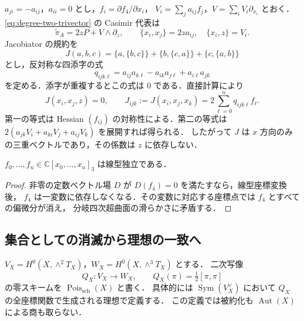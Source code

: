 $a_{ji}=-a_{ij}$，$a_{ii}=0$ とし，$f_i=\partial f_4/\partial x_i$，
$V_i=\sum_j a_{ij}f_j$，$V=\sum_iV_i\partial_{x_i}$ とおく．
\eqref{eq:degree-two-trivector} の Casimir 代表は
\begin{equation}
 \widetilde\pi_A=2zP+V\wedge\partial_z,
 \qquad
 \{x_i,x_j\}=2za_{ij},\quad\{x_i,z\}=V_i.
 \label{eq:degree-two-bivector}
\end{equation}
Jacobiator の規約を
\[
 J(a,b,c)=\{a,\{b,c\}\}+\{b,\{c,a\}\}+\{c,\{a,b\}\}
\]
とし，反対称な四添字の式
\begin{equation}
 q_{ijk\ell}=a_{ij}a_{k\ell}-a_{ik}a_{j\ell}+a_{i\ell}a_{jk}
 \label{eq:plucker-equation}
\end{equation}
を定める．添字が重複するとこの式は $0$ である．直接計算により
\begin{equation}
 J(x_i,x_j,z)=0,\qquad
 J_{ijk}:=J(x_i,x_j,x_k)=2\sum_{\ell=0}^n q_{ijk\ell}f_\ell.
 \label{eq:jacobi-plucker-identity}
\end{equation}
第一の等式は Hessian $(f_{ij})$ の対称性による．第二の等式は
$2(a_{jk}V_i+a_{ki}V_j+a_{ij}V_k)$ を展開すれば得られる．
したがって $J$ は $x$ 方向のみの三重ベクトルであり，その係数は $z$ に依存しない．

\begin{lemma}[分岐方程式の偏微分の独立性]
\label{lemma:gradient-independence}
$f_0,\ldots,f_n\in\mathbb C[x_0,\ldots,x_n]_3$ は線型独立である．
\end{lemma}

\begin{proof}
非零の定数ベクトル場 $D$ が $D(f_4)=0$ を満たすなら，線型座標変換後，
$f_4$ は一変数に依存しなくなる．その変数に対応する座標点では $f_4$ とすべての偏微分が消え，
分岐四次超曲面の滑らかさに矛盾する．
\end{proof}

\subsection{集合としての消滅から理想の一致へ}

\begin{definition}
\label{def:poisson-scheme}
$V_X=H^0(X,\wedge^2T_X)$，$W_X=H^0(X,\wedge^3T_X)$ とする．
二次写像
\[
 Q_X:V_X\longrightarrow W_X,\qquad
 Q_X(\pi)=\tfrac12[\pi,\pi]
\]
の零スキームを $\operatorname{Pois}_{\mathrm{sch}}(X)$ と書く．
具体的には $\operatorname{Sym}(V_X^\vee)$ において
$Q_X$ の全座標関数で生成される理想で定義する．
この定義では被約化も $\operatorname{Aut}(X)$ による商も取らない．
\end{definition}

